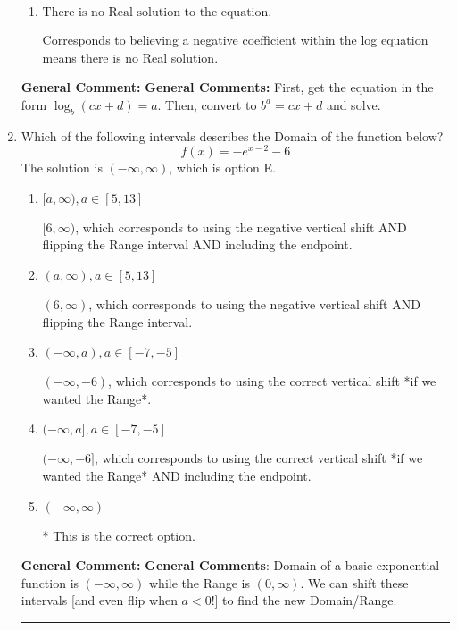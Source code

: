 \documentclass{extbook}[14pt]
\newcommand{\litem}[1]{\item #1

\rule{\textwidth}{0.4pt}}
\begin{document}
\begin{enumerate}
{\begin{enumerate}[label=\Alph*.]
$x = -11.000$, which corresponds to reversing the base and exponent when converting and reversing the value with $x$.
\item \( \text{There is no Real solution to the equation.} \)

Corresponds to believing a negative coefficient within the log equation means there is no Real solution.
\end{enumerate}

\textbf{General Comment:} \textbf{General Comments:} First, get the equation in the form $\log_b{(cx+d)} = a$. Then, convert to $b^a = cx+d$ and solve.
}
\litem{
Which of the following intervals describes the Domain of the function below?
\[ f(x) = -e^{x-2}-6 \]The solution is \( (-\infty, \infty) \), which is option E.\begin{enumerate}[label=\Alph*.]
\item \( [a, \infty), a \in [5, 13] \)

$[6, \infty)$, which corresponds to using the negative vertical shift AND flipping the Range interval AND including the endpoint.
\item \( (a, \infty), a \in [5, 13] \)

$(6, \infty)$, which corresponds to using the negative vertical shift AND flipping the Range interval.
\item \( (-\infty, a), a \in [-7, -5] \)

$(-\infty, -6)$, which corresponds to using the correct vertical shift *if we wanted the Range*.
\item \( (-\infty, a], a \in [-7, -5] \)

$(-\infty, -6]$, which corresponds to using the correct vertical shift *if we wanted the Range* AND including the endpoint.
\item \( (-\infty, \infty) \)

* This is the correct option.
\end{enumerate}

\textbf{General Comment:} \textbf{General Comments}: Domain of a basic exponential function is $(-\infty, \infty)$ while the Range is $(0, \infty)$. We can shift these intervals [and even flip when $a<0$!] to find the new Domain/Range.
}
\end{enumerate}
\end{document}
